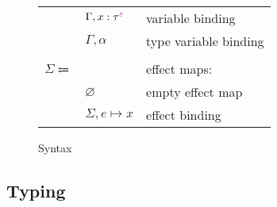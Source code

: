 \documentclass[12pt]{article}
\newcommand\anno[2]{#1 : #2}
\newcommand\eVar{x}
\newcommand\type{\tau}
\newcommand\tVar{\alpha}
\newcommand\tEmbellished[2]{{#1}^{\textcolor{violet}{#2}}}
\newcommand\row{\varepsilon}
\newcommand\context{\Gamma}
\newcommand\cTExtend[4]{#1, \anno{#2}{\tEmbellished{#3}{#4}}}
\newcommand\cKExtend[2]{#1, #2}
\newcommand\effect{e}
\newcommand\effectMap{\Sigma}
\newcommand\emMap[2]{#1 \mapsto #2}
\newcommand\emEmpty{\varnothing}
\newcommand\emExtend[3]{#1, \emMap{#2}{#3}}
\begin{document}
\begin{figure}[H]
\begin{mdframed}[backgroundcolor=none]
\begin{center}
\begin{tabular}{l l l}
              & $\cTExtend{\context}{\eVar}{\type}{\row}$ & variable binding \\
              & $\cKExtend{\context}{\tVar}$ & type variable binding \\
              \\
              $\effectMap \Coloneqq$ & & effect maps: \\
              & $\emEmpty$ & empty effect map \\
              & $\emExtend{\effectMap}{\effect}{\eVar}$ & effect binding \\
            \end{tabular}
          \end{center}

          \caption{Syntax}\label{fig:syntax}
        \end{mdframed}
      \end{figure}

    \subsection{Typing}
\end{document}
